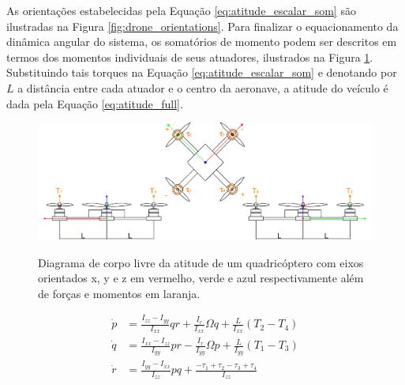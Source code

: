 \documentclass[main.tex]{subfiles}
\begin{document}
As orientações estabelecidas pela Equação \ref{eq:atitude_escalar_som} são ilustradas na Figura \ref{fig:drone_orientations}. Para finalizar o equacionamento da dinâmica angular do sistema, os somatórios de momento podem ser descritos em termos dos momentos individuais de seus atuadores, ilustrados na Figura \ref{fig:attitude_dcl}. Substituindo tais torques na Equação \ref{eq:atitude_escalar_som} e denotando por $L$ a distância entre cada atuador e o centro da aeronave, a atitude do veículo é dada pela Equação \ref{eq:atitude_full}.

\begin{figure}[!h]
    \centering
    \caption{Diagrama de corpo livre da atitude de um quadricóptero com eixos orientados x, y e z em vermelho, verde e azul respectivamente além de forças e momentos em laranja.}
    \includegraphics[width=1\textwidth]{capitulos/modelagem/imgs/attitude_dcl.png}
    \label{fig:attitude_dcl}
\end{figure}

\begin{equation}\label{eq:atitude_full}
    \begin{split}
        \dot{p} &= \frac{I_{zz} - I_{yy}}{I_{xx}}qr + \frac{I_r}{I_{xx}}\Omega q + \frac{L}{I_{xx}}(T_2 - T_4)\\
        \dot{q} &= \frac{I_{xx} - I_{zz}}{I_{yy}}pr - \frac{I_r}{I_{yy}}\Omega p + \frac{L}{I_{yy}}(T_1 - T_3)\\
        \dot{r} &= \frac{I_{yy} - I_{xx}}{I_{zz}}pq + \frac{-\tau_1 + \tau_2 - \tau_3 + \tau_4}{I_{zz}}
    \end{split}    
\end{equation}
\end{document}
